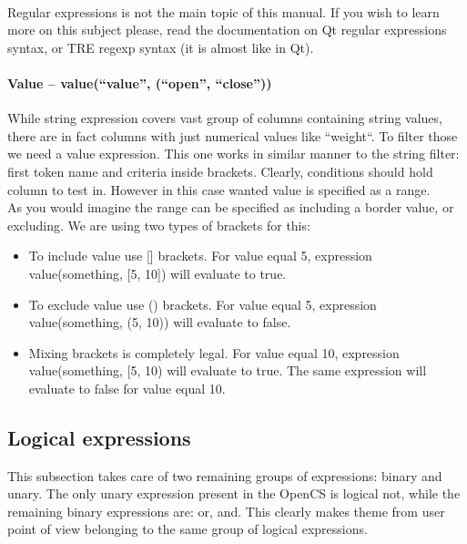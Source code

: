 \\
Regular expressions is not the main topic of this manual. If you wish to learn more on this subject please, read the documentation on Qt regular expressions syntax, or TRE regexp syntax (it is almost like in Qt).

\paragraph{Value -- value(``value'', (``open'', ``close''))}
While string expression covers vast group of columns containing string values, there are in fact columns with just numerical values like ``weight``. To filter those we need a value expression. This one works in similar manner to the string filter: first token name and criteria inside brackets. Clearly, conditions should hold column to test in. However in this case wanted value is specified as a range.\\
As you would imagine the range can be specified as including a border value, or excluding. We are using two types of brackets for this:
\begin{itemize}
 \item To include value use [] brackets. For value equal 5, expression value(something, [5, 10]) will evaluate to true.
 \item To exclude value use () brackets. For value equal 5, expression value(something, (5, 10)) will evaluate to false.
 \item Mixing brackets is completely legal. For value equal 10, expression value(something, [5, 10) will evaluate to true. The same expression will evaluate to false for value equal 10.
\end{itemize}

\subsection{Logical expressions}
This subsection takes care of two remaining groups of expressions: binary and unary. The only unary expression present in the OpenCS is logical not, while the remaining binary expressions are: or, and. This clearly makes theme from user point of view belonging to the same group of logical expressions.

